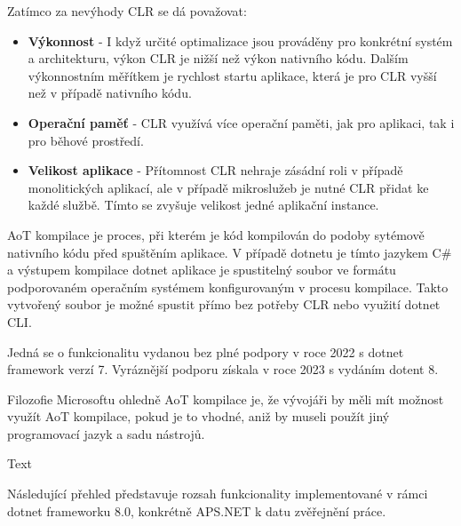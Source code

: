 Zatímco za nevýhody CLR se dá považovat:
\begin{itemize}
    \item  \textbf{Výkonnost} - I když určité optimalizace jsou prováděny pro konkrétní systém a architekturu, výkon CLR je nižší než výkon nativního kódu. Dalším výkonnostním měřítkem je rychlost startu aplikace, která je pro CLR vyšší než v případě nativního kódu.
    \item \textbf{Operační paměť} - CLR využívá více operační paměti, jak pro aplikaci, tak i pro běhové prostředí.
    \item \textbf{Velikost aplikace} - Přítomnost CLR nehraje zásádní roli v případě monolitických aplikací, ale v případě mikroslužeb je nutné CLR přidat ke každé službě. Tímto se zvyšuje velikost jedné aplikační instance.
\end{itemize}

AoT kompilace je proces, při kterém je kód kompilován do podoby sytémově nativního kódu před spuštěním aplikace. V případě dotnetu je tímto jazykem C\# a výstupem kompilace dotnet aplikace je spustitelný soubor ve formátu podporovaném operačním systémem konfigurovaným v procesu kompilace. Takto vytvořený soubor je možné spustit přímo bez potřeby CLR nebo využití dotnet CLI. 

Jedná se o funkcionalitu vydanou bez plné podpory v roce 2022 s dotnet framework verzí 7. Vyráznější podporu získala v roce 2023 s vydáním dotent 8.

Filozofie Microsoftu ohledně AoT kompilace je, že vývojáři by měli mít možnost využít AoT kompilace, pokud je to vhodné, aniž by museli použít jiný programovací jazyk a sadu nástrojů.

Text





Následující přehled představuje rozsah funkcionality implementované v rámci dotnet frameworku 8.0, konkrétně APS.NET k datu zvěřejnění práce.

